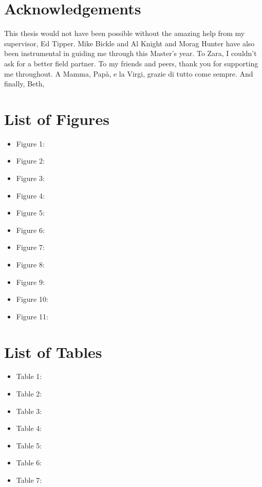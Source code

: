 \documentclass[hidelinks, 12pt]{article} %
\begin{document}

\newpage


\tableofcontents


\newpage


\section*{Acknowledgements}

This thesis would not have been possible without the amazing help from my supervisor, Ed Tipper. Mike Bickle and Al Knight and Morag Hunter have also been instrumental in guiding me through this Master's year. To Zara, I couldn't ask for a better field partner. To my friends and peers, thank you for supporting me throughout. A Mamma, Papà, e la Virgi, grazie di tutto come sempre. And finally, Beth, 


\newpage

\section*{List of Figures}

\begin{itemize}

  \item Figure 1:
  \item Figure 2: 
  \item Figure 3:
  \item Figure 4:
  \item Figure 5: 
  \item Figure 6: 
  \item Figure 7:
  \item Figure 8:
  \item Figure 9:
  \item Figure 10:
  \item Figure 11:

\end{itemize}

\section*{List of Tables}

\begin{itemize}

  \item Table 1:
  \item Table 2: 
  \item Table 3:
  \item Table 4:
  \item Table 5: 
  \item Table 6: 
  \item Table 7:

\end{itemize}
\end{document}
